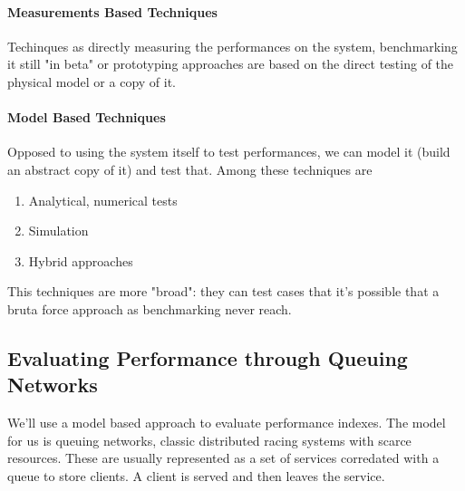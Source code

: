 \documentclass[10pt,a4paper]{article}
\begin{document}
				\paragraph{Measurements Based Techniques}
					Techinques as directly measuring the performances on the system, benchmarking it still "in beta" or prototyping approaches are based on the direct testing of the physical model or a copy of it.
					
				\paragraph{Model Based Techniques}
					Opposed to using the system itself to test performances, we can model it (build an abstract copy of it) and test that. Among these techniques are
					\begin{enumerate}
						\item Analytical, numerical tests
						\item Simulation
						\item Hybrid approaches
					\end{enumerate}
					This techniques are more "broad": they can test cases that it's possible that a bruta force approach as benchmarking never reach. 
					
			\subsection{Evaluating Performance through Queuing Networks}
				We'll use a model based approach to evaluate performance indexes. The model for us is queuing networks, classic distributed racing systems with scarce resources. These are usually represented as a set of services corredated with a queue to store clients. A client is served and then leaves the service. 
				
\end{document}
